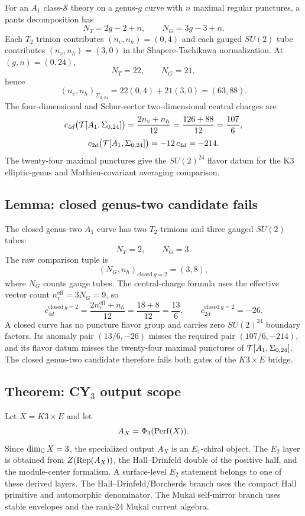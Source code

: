 For an $A_1$ class-$\mathcal S$ theory on a genus-$g$ curve with $n$
maximal regular punctures, a pants decomposition has
\[
  N_T = 2g-2+n,\qquad N_G = 3g-3+n.
\]
Each $T_2$ trinion contributes $(n_v,n_h)=(0,4)$ and each gauged
$SU(2)$ tube contributes $(n_v,n_h)=(3,0)$ in the
Shapere-Tachikawa normalization.  At $(g,n)=(0,24)$,
\[
  N_T=22,\qquad N_G=21,
\]
hence
\[
  (n_v,n_h)_{\Sigma_{0,24}}
  =22(0,4)+21(3,0)
  =(63,88).
\]
The four-dimensional and Schur-sector two-dimensional central charges
are
\[
  c_{4d}\bigl(\mathcal{T}[A_1,\Sigma_{0,24}]\bigr)
  =\frac{2n_v+n_h}{12}
  =\frac{126+88}{12}
  =\frac{107}{6},
\]
\[
  c_{2d}\bigl(\mathcal{T}[A_1,\Sigma_{0,24}]\bigr)
  =-12\,c_{4d}
  =-214.
\]
The twenty-four maximal punctures give the $SU(2)^{24}$ flavor datum
for the K3 elliptic-genus and Mathieu-covariant
averaging comparison.

\subsection{Lemma: closed genus-two candidate fails}
\label{subsec:closed-genus-two-candidate-fails}

The closed genus-two $A_1$ curve has two $T_2$ trinions and three
gauged $SU(2)$ tubes:
\[
  N_T=2,\qquad N_G=3.
\]
The raw comparison tuple is
\[
  (N_G,n_h)_{\mathrm{closed}\ g=2}=(3,8),
\]
where $N_G$ counts gauge tubes.  The central-charge formula uses the
effective vector count $n_v^{\mathrm{eff}}=3N_G=9$, so
\[
  c_{4d}^{\mathrm{closed}\ g=2}
  =\frac{2n_v^{\mathrm{eff}}+n_h}{12}
  =\frac{18+8}{12}
  =\frac{13}{6},
\qquad
  c_{2d}^{\mathrm{closed}\ g=2}=-26.
\]
A closed curve has no puncture flavor group and carries zero
$SU(2)^{24}$ boundary factors.  Its anomaly pair $(13/6,-26)$ misses
the required pair $(107/6,-214)$, and its flavor datum misses the
twenty-four maximal punctures of $\mathcal{T}[A_1,\Sigma_{0,24}]$.  The
closed genus-two candidate therefore fails both gates of the
$K3\times E$ bridge.

\subsection{Theorem: CY$_3$ output scope}
\label{subsec:k3e-cy3-output-scope}

Let $X=K3\times E$ and let
\[
  A_X=\Phi_3(\mathrm{Perf}(X)).
\]
Since $\dim_{\mathbb{C}}X=3$, the specialized output $A_X$ is an $E_1$-chiral
object.  The $E_2$ layer is obtained from $Z(\mathrm{Rep}(A_X))$, the
Hall--Drinfeld double of the positive half, and the module-center
formalism.  A surface-level $E_2$ statement belongs to one of these
derived layers.  The Hall--Drinfeld/Borcherds branch uses the compact Hall
primitive and automorphic denominator.  The Mukai self-mirror branch
uses stable envelopes and the rank-\(24\) Mukai current algebra.

